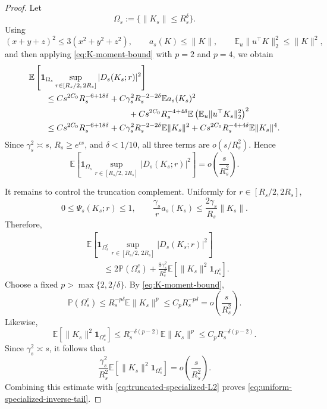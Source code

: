 \documentclass[11pt]{article}
\newcommand{\Pbb}{\mathbb P}
\newcommand{\Ebb}{\mathbb E}
\newcommand{\1}{\mathbf 1}
\begin{document}
\begin{proof}
Let
\[
        \Omega_s:=\{\|K_s\|\le R_s^\delta\}.
\]
Using
\[
        (x+y+z)^2\le 3(x^2+y^2+z^2),
        \qquad
        a_s(K)\le\|K\|,
        \qquad
        \Ebb_u\|u^\top K\|_2^2\le\|K\|^2,
\]
and then applying \eqref{eq:K-moment-bound} with \(p=2\) and \(p=4\),
we obtain
\begin{align*}
        &\Ebb\left[
        \mathbf 1_{\Omega_s}
        \sup_{r\in[R_s/2,\,2R_s]}
        |D_s(K_s;r)|^2
        \right]
\\
        &\qquad\le
        C s^{2C_0}R_s^{-6+18\delta}
        +
        C\gamma_s^2R_s^{-2-2\delta}
        \Ebb a_s(K_s)^2
\\
        &\hspace{4.2cm}
        +
        C s^{2C_0}R_s^{-4+4\delta}
        \Ebb\left(
        \Ebb_u\|u^\top K_s\|_2^2
        \right)^2
\\
        &\qquad\le
        C s^{2C_0}R_s^{-6+18\delta}
        +
        C\gamma_s^2R_s^{-2-2\delta}
        \Ebb\|K_s\|^2
        +
        C s^{2C_0}R_s^{-4+4\delta}
        \Ebb\|K_s\|^4.
\end{align*}
Since \(\gamma_s^2\asymp s\), \(R_s\ge e^{cs}\), and
\(\delta<1/10\), all three terms are \(o(s/R_s^2)\). Hence
\begin{equation}
        \Ebb\left[
        \mathbf 1_{\Omega_s}
        \sup_{r\in[R_s/2,\,2R_s]}
        |D_s(K_s;r)|^2
        \right]
        =
        o\left(\frac{s}{R_s^2}\right).
        \label{eq:truncated-specialized-L2}
\end{equation}

It remains to control the truncation complement. Uniformly for
\(r\in[R_s/2,2R_s]\),
\[
        0\le\Psi_s(K_s;r)\le1,
        \qquad
        \frac{\gamma_s}{r}a_s(K_s)
        \le
        \frac{2\gamma_s}{R_s}\|K_s\|.
\]
Therefore,
\begin{align*}
        &\Ebb\left[
        \mathbf 1_{\Omega_s^c}
        \sup_{r\in[R_s/2,\,2R_s]}
        |D_s(K_s;r)|^2
        \right]
\\
        &\qquad\le
        2\Pbb(\Omega_s^c)
        +
        \frac{8\gamma_s^2}{R_s^2}
        \Ebb\left[
        \|K_s\|^2\mathbf 1_{\Omega_s^c}
        \right].
\end{align*}
Choose a fixed \(p>\max\{2,2/\delta\}\). By
\eqref{eq:K-moment-bound},
\[
        \Pbb(\Omega_s^c)
        \le
        R_s^{-p\delta}\Ebb\|K_s\|^p
        \le
        C_pR_s^{-p\delta}
        =
        o\left(\frac{s}{R_s^2}\right).
\]
Likewise,
\[
        \Ebb\left[
        \|K_s\|^2\mathbf 1_{\Omega_s^c}
        \right]
        \le
        R_s^{-\delta(p-2)}
        \Ebb\|K_s\|^p
        \le
        C_pR_s^{-\delta(p-2)}.
\]
Since \(\gamma_s^2\asymp s\), it follows that
\[
        \frac{\gamma_s^2}{R_s^2}
        \Ebb\left[
        \|K_s\|^2\mathbf 1_{\Omega_s^c}
        \right]
        =
        o\left(\frac{s}{R_s^2}\right).
\]
Combining this estimate with
\eqref{eq:truncated-specialized-L2} proves
\eqref{eq:uniform-specialized-inverse-tail}.
\end{proof}
\end{document}
